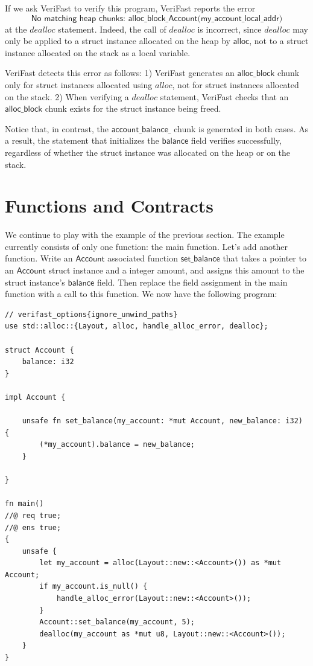 \documentclass{article}
\begin{document}
If we ask VeriFast to verify this program, VeriFast reports the
error $$\textsf{No matching heap chunks:
alloc\_block\_Account(my\_account\_local\_addr)}$$ at the
$\mathit{dealloc}$ statement. Indeed, the call of $\mathit{dealloc}$ is incorrect,
since $\mathit{dealloc}$ may only be applied to a struct instance
allocated on the heap by $\mathsf{alloc}$, not to a struct
instance allocated on the stack as a local variable.

VeriFast detects this error as follows: 1) VeriFast generates an
$\mathsf{alloc\_block}$ chunk only for struct instances
allocated using $\mathit{alloc}$, not for struct instances
allocated on the stack. 2) When verifying a $\mathit{dealloc}$
statement, VeriFast checks that an $\mathsf{alloc\_block}$
chunk exists for the struct instance being freed.

Notice that, in contrast, the $\mathsf{account\_balance\_}$ chunk
is generated in both cases. As a result, the statement that
initializes the $\mathsf{balance}$ field verifies successfully,
regardless of whether the struct instance was allocated on the
heap or on the stack.

\section{Functions and Contracts}\label{section:functions}

We continue to play with the example of the previous section.
The example currently consists of only one function: the main
function. Let's add another function. Write an $\mathsf{Account}$ associated function
$\mathsf{set\_balance}$ that takes a pointer to an
$\mathsf{Account}$ struct instance and a integer amount, and
assigns this amount to the struct instance's $\mathsf{balance}$
field. Then replace the field assignment in the main function
with a call to this function. We now have the following
program:

\begin{lstlisting}
// verifast_options{ignore_unwind_paths}
use std::alloc::{Layout, alloc, handle_alloc_error, dealloc};

struct Account {
    balance: i32
}

impl Account {

    unsafe fn set_balance(my_account: *mut Account, new_balance: i32) {
        (*my_account).balance = new_balance;
    }

}

fn main()
//@ req true;
//@ ens true;
{
    unsafe {
        let my_account = alloc(Layout::new::<Account>()) as *mut Account;
        if my_account.is_null() {
            handle_alloc_error(Layout::new::<Account>());
        }
        Account::set_balance(my_account, 5);
        dealloc(my_account as *mut u8, Layout::new::<Account>());
    }
}
\end{lstlisting}
\end{document}
